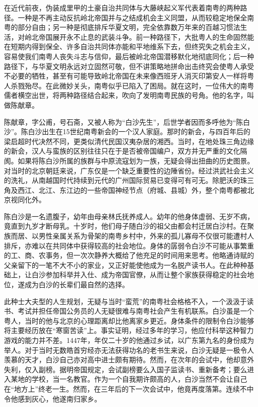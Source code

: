 	

在近代前夜，伪装成里甲的土豪自治共同体与大藤峡起义军代表着南粤的两种路径。一种是不再主动反抗岭北帝国并与之结成机会主义同盟，从而较稳定地保全南粤的部分自由；另一种是彻底排斥华夏文明，完全依靠数万年来的百越习惯法生活，对岭北帝国展开永不止息的武装斗争。前一种路径下，大批粤人的生命固然能在短期内得到保全、许多自治共同体亦能和平地维系下去，但终究失之机会主义，容易使我们南粤人丧失斗志与信仰，最后被岭北帝国潜移默化地彻底同化；后一种路径下，与华夏文明永远对立固然可敬，但不讲策略地拼命出击终究会使粤人承受不必要的牺牲，甚至有可能导致岭北帝国在未来像西班牙人消灭印第安人一样将粤人杀戮殆尽。在此微妙关头，南粤似乎已陷入了困局。就在这时，一位伟大的南粤儒者横空出世，将两种路径结合起来，吹向了发明南粤民族的号角。他的名字，叫做陈献章。

陈献章，字公甫，号石斋，又被人称为“白沙先生”，后世学者因而多呼他为“陈白沙”。陈白沙出生在15世纪南粤新会的一个汉人家庭。那时的新会，与四百年后的梁启超时代决然不同，更类似清代民国汉夷杂居的湘西。当时，在地处珠三角边缘的新会，汉人与蛮族的区别往往只在于是否被帝国编户，双方并无严重的文化隔阂。如果将陈白沙所属的族群与中原流寇划为一族，无疑会得出扭曲的历史图景。对当时的北京朝廷来说，广东仅是一个缺乏重要性的边陲省份。经过洪武社会主义的洗礼，从南越国时代持续到元代的广州国际贸易已变得可有可无。除肥沃的珠三角及西江、北江、东江边的一些帝国神经节点（府城、县城）外，整个南粤都被北京视同化外。

陈白沙是一名遗腹子，幼年由母亲林氏抚养成人。幼年的他身体虚弱、无岁不病，竟直到九岁才断母乳。十岁时，他们母子随白沙的祖父由都会村迁居白沙村。在聚族而居、以男性亲属关系为骨架的南粤乡村中，外来的孤儿寡母不仅很可能遭村人排斥，亦难以在共同体中获得较高的社会地位。身体的孱弱令白沙不可能从事繁重的工、商、农事务，但一次次静养大概给了他充足的时间用来思考。他略通诗赋的父亲留下的一笔不大不小的家业，又正好能使他成为一名脱产读书人。在此种种基础上，让白沙参加科举并入仕、成为帝国官僚，从而让整个家族获得稳定的社会地位，遂成为白沙的长辈们最自然的选择。

此种士大夫型的人生规划，无疑与当时“蛮荒”的南粤社会格格不入，一个汲汲于读书、考试并担任帝国公务员的人无疑很难与南粤社会产生有机联系。白沙虽是一个粤人，当时的他与北京的心理距离却比他离家乡更近。身体条件的限制令白沙能够将主要经历放在“寒窗苦读”上。事实证明，经过多年的学习，他应付科举这种智力游戏的能力并不差。1447年，年仅二十岁的他通过乡试，以广东第九名的身份成为举人。对于当时无数皓首穷经亦无法获得功名的老书生来说，白沙无疑是一极令人羡慕的天才，白沙自己亦对高中进士颇有期待。然而，在次年的会试中，他却意外失利，仅入副榜。据明帝国规定，会试副榜要么入国子监读书、重新备考；要么进入某地的学校，当一名教官。作为一个自我期许颇高的人，白沙当然不会让自己在“地方上”终老一生。然而，在三年后的下一次会试中，他竟再度落第。连续不中令他感到灰心，他遂南归家乡。

